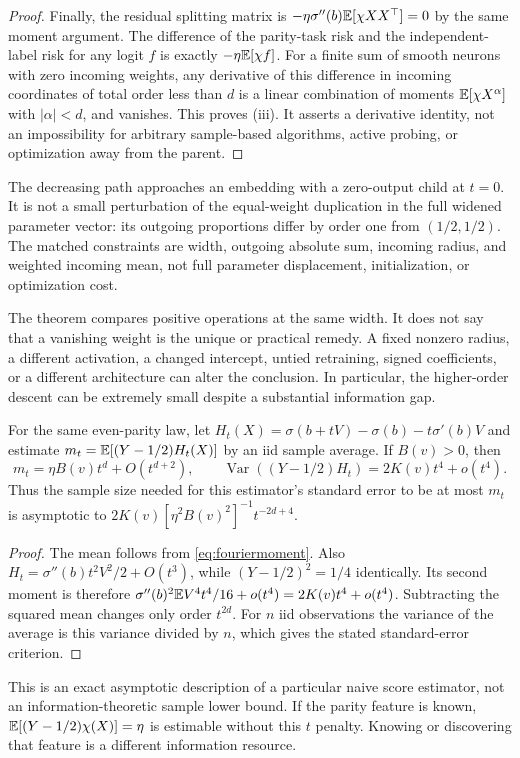 \begin{proof}
Finally, the residual splitting matrix is
$-\eta\sigma''(b)\mathbb E[\chi XX^\top]=0$ by the same moment argument.
The difference of the parity-task risk and the independent-label risk for
any logit $f$ is exactly $-\eta\mathbb E[\chi f]$. For a finite sum of smooth
neurons with zero incoming weights, any derivative of this difference in
incoming coordinates of total order less than $d$ is a linear combination
of moments $\mathbb E[\chi X^\alpha]$ with $|\alpha|<d$, and vanishes. This proves
(iii). It asserts a derivative identity, not an impossibility for arbitrary
sample-based algorithms, active probing, or optimization away from the parent.
\end{proof}

The decreasing path approaches an embedding with a zero-output child at
$t=0$. It is not a small perturbation of the equal-weight duplication in
the full widened parameter vector: its outgoing proportions differ by order
one from $(1/2,1/2)$. The matched constraints are width, outgoing absolute
sum, incoming radius, and weighted incoming mean, not full parameter
displacement, initialization, or optimization cost.

The theorem compares positive operations at the same width. It does not
say that a vanishing weight is the unique or practical remedy. A fixed
nonzero radius, a different activation, a changed intercept, untied
retraining, signed coefficients, or a different architecture can alter
the conclusion. In particular, the higher-order descent can be extremely
small despite a substantial information gap.

\begin{proposition}\label{prop:snr}
For the same even-parity law, let
$H_t(X)=\sigma(b+tV)-\sigma(b)-t\sigma'(b)V$ and estimate
$m_t=\mathbb E[(Y-1/2)H_t(X)]$ by an iid sample average. If $B(v)>0$, then
\[
 m_t=\eta B(v)t^d+O(t^{d+2}),\qquad
 \operatorname{Var}((Y-1/2)H_t)=2K(v)t^4+o(t^4).
\]
Thus the sample size needed for this estimator's standard error to be at
most $m_t$ is asymptotic to
$2K(v)[\eta^2B(v)^2]^{-1}t^{-2d+4}$.
\end{proposition}
\begin{proof}
The mean follows from \eqref{eq:fouriermoment}. Also
$H_t=\sigma''(b)t^2V^2/2+O(t^3)$, while $(Y-1/2)^2=1/4$
identically. Its second moment is therefore
$\sigma''(b)^2\mathbb E V^4t^4/16+o(t^4)=2K(v)t^4+o(t^4)$.
Subtracting the squared mean changes only order $t^{2d}$.
For $n$ iid observations the variance of the average is this variance
divided by $n$, which gives the stated standard-error criterion.
\end{proof}
This is an exact asymptotic description of a particular naive score estimator,
not an information-theoretic sample lower bound. If the parity feature is
known, $\mathbb E[(Y-1/2)\chi(X)]=\eta$ is estimable without this $t$ penalty.
Knowing or discovering that feature is a different information resource.
